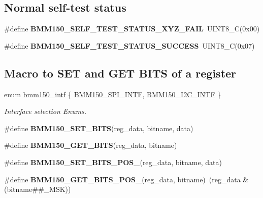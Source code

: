 \subsection*{Normal self-\/test status}
\begin{DoxyCompactItemize}
\item 
\mbox{\label{group___b_m_m150_gae36796ee91096d08d9606752d23edb49}} 
\#define {\bfseries B\+M\+M150\+\_\+\+S\+E\+L\+F\+\_\+\+T\+E\+S\+T\+\_\+\+S\+T\+A\+T\+U\+S\+\_\+\+X\+Y\+Z\+\_\+\+F\+A\+IL}~U\+I\+N\+T8\+\_\+C(0x00)
\item 
\mbox{\label{group___b_m_m150_ga183c425a68051efb83f90bb211d62093}} 
\#define {\bfseries B\+M\+M150\+\_\+\+S\+E\+L\+F\+\_\+\+T\+E\+S\+T\+\_\+\+S\+T\+A\+T\+U\+S\+\_\+\+S\+U\+C\+C\+E\+SS}~U\+I\+N\+T8\+\_\+C(0x07)
\end{DoxyCompactItemize}
\subsection*{Macro to S\+ET and G\+ET B\+I\+TS of a register}
\begin{DoxyCompactItemize}
\item 
enum \hyperlink{group___b_m_m150_ga479329e9f54743abfe872741fcce4ae9}{bmm150\+\_\+intf} \{ \hyperlink{group___b_m_m150_gga479329e9f54743abfe872741fcce4ae9ad7bdf3f9fb3ede40544dff5ad13b06ee}{B\+M\+M150\+\_\+\+S\+P\+I\+\_\+\+I\+N\+TF}, 
\hyperlink{group___b_m_m150_gga479329e9f54743abfe872741fcce4ae9a519204c91f338db8c681885c191d0caa}{B\+M\+M150\+\_\+\+I2\+C\+\_\+\+I\+N\+TF}
 \}\begin{DoxyCompactList}\small\item\em Interface selection Enums. \end{DoxyCompactList}
\item 
\#define {\bfseries B\+M\+M150\+\_\+\+S\+E\+T\+\_\+\+B\+I\+TS}(reg\+\_\+data,  bitname,  data)
\item 
\#define {\bfseries B\+M\+M150\+\_\+\+G\+E\+T\+\_\+\+B\+I\+TS}(reg\+\_\+data,  bitname)
\item 
\#define {\bfseries B\+M\+M150\+\_\+\+S\+E\+T\+\_\+\+B\+I\+T\+S\+\_\+\+P\+O\+S\+\_}(reg\+\_\+data,  bitname,  data)
\item 
\mbox{\label{group___b_m_m150_gab901d7ff4cfb84e13576f813e84019ec}} 
\#define {\bfseries B\+M\+M150\+\_\+\+G\+E\+T\+\_\+\+B\+I\+T\+S\+\_\+\+P\+O\+S\+\_}(reg\+\_\+data,  bitname)~(reg\+\_\+data \& (bitname\#\#\+\_\+\+M\+SK))
\end{DoxyCompactItemize}
